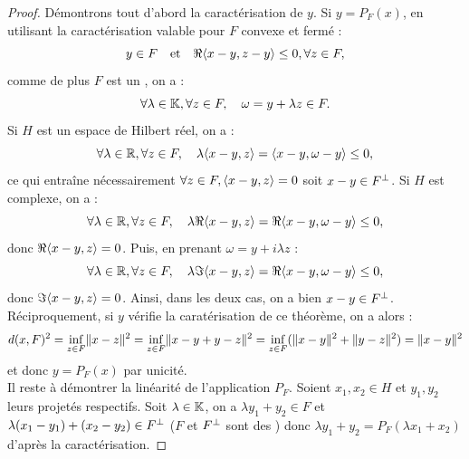 \begin{proof}
Démontrons tout d'abord la caractérisation de $y$.
Si $y = P_F(x)$, en utilisant la caractérisation valable pour $F$ convexe et fermé :
\[ y \in F \quad \text{et} \quad \Re{\langle x-y, z-y\rangle \leq 0}, \forall z \in F , \]
comme de plus $F$ est un \sev, on a :
\[ \forall \lambda \in \mathbb{K}, \forall z \in F, \quad \omega = y + \lambda z \in F . \]
Si $H$ est un espace de Hilbert réel, on a :
\[ \forall \lambda \in \mathbb{R}, \forall z \in F, \quad \lambda \langle x-y, z\rangle = \langle x-y, \omega - y\rangle \leq 0 , \]
ce qui entraîne nécessairement $\forall z \in F, \langle x-y, z\rangle = 0$ soit $x-y \in F^{\perp}$.
Si $H$ est complexe, on a :
\[ \forall \lambda \in \mathbb{R}, \forall z \in F, \quad \lambda \Re{\langle x-y, z\rangle} = \Re{\langle x-y, \omega - y\rangle} \leq 0 , \]
donc $\Re{\langle x-y, z\rangle} = 0$. Puis, en prenant $\omega = y + i \lambda z$ :
\[ \forall \lambda \in \mathbb{R}, \forall z \in F, \quad \lambda \Im{\langle x-y, z\rangle} = \Re{\langle x-y, \omega - y\rangle} \leq 0 , \]
donc $\Im{\langle x-y, z\rangle} = 0$. 
Ainsi, dans les deux cas, on a bien $x-y \in F^{\perp}$. \\

Réciproquement, si $y$ vérifie la caratérisation de ce théorème, on a alors :
\[ d(x,F)^2 = \inf_{z \in F} \lVert x-z\rVert^2 = \inf_{z \in F} \lVert x-y+y-z\rVert^2 = \inf_{z \in F} ( \lVert x-y\rVert^2 + \lVert y-z\rVert^2 ) 
	= \lVert x-y\rVert^2 \]
et donc $y = P_F(x)$ par unicité. \\

Il reste à démontrer la linéarité de l'application $P_F$. 
Soient $x_1, x_2 \in H$ et $y_1, y_2$ leurs projetés respectifs. 
Soit $\lambda \in \mathbb{K}$, on a $\lambda y_1 + y_2 \in F$ et $\lambda (x_1 - y_1) + (x_2-y_2) \in F^{\perp}$ ($F$ et $F^{\perp}$ sont des \sev) 
donc $\lambda y_1 + y_2 = P_F(\lambda x_1 + x_2)$ d'après la caractérisation.
\end{proof}

